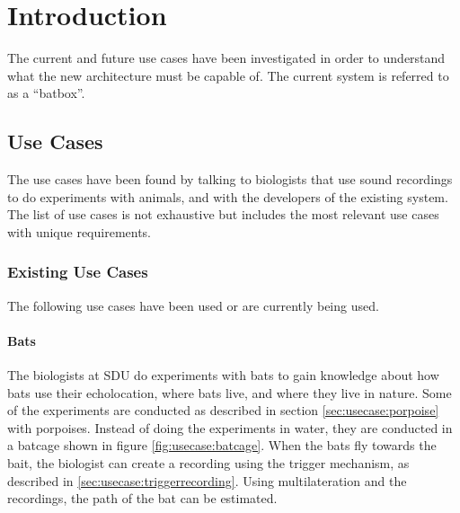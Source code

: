 \chapter{Introduction}
The current and future use cases have been investigated in order to understand what the new architecture must be capable of.  The current system is referred to as a ``batbox''.


\section{Use Cases} \label{sec:usecases}
The use cases have been found by talking to biologists that use sound recordings to do experiments with animals, and with the developers of the existing system. The list of use cases is not exhaustive but includes the most relevant use cases with unique requirements.

\subsection{Existing Use Cases}
The following use cases have been used or are currently being used.

\subsubsection{Bats} \label{sec:usecase:bats}
The biologists at SDU do experiments with bats to gain knowledge about how bats use their echolocation, where bats live, and where they live in nature.
Some of the experiments are conducted as described in section \ref{sec:usecase:porpoise} with porpoises. Instead of doing the experiments in water, they are conducted in a batcage shown in figure \ref{fig:usecase:batcage}. When the bats fly towards the bait, the biologist can create a recording using the trigger mechanism, as described in \ref{sec:usecase:triggerrecording}. Using multilateration and the recordings, the path of the bat can be estimated.

